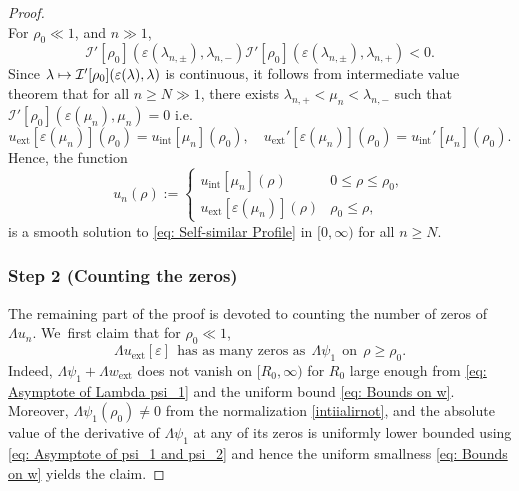\documentclass[10pt]{article}
\newcommand{\ie}{i.e.}
\newcommand\mto{\mathchoice{\longmapsto}{\mapsto}{\mapsto}{\mapsto}}
\theoremstyle{plain}
\theoremstyle{definition}
\DeclareMathOperator{\exterior}{ext}
\DeclareMathOperator{\interior}{int}
\begin{document}
\begin{proof}
\[\]
For $\rho_0\ll 1$, and $n\gg 1$,
\[
\mathcal I'[\rho_0](\varepsilon(\lambda_{n,\pm}),\lambda_{n,-})\mathcal I'[\rho_0](\varepsilon(\lambda_{n,\pm}),\lambda_{n,+})<0.
\]
Since $\lambda\mto \mathcal I'[\rho_0](\varepsilon(\lambda),\lambda)$ is continuous, it follows from intermediate value theorem that for all $n\ge N\gg1$, there exists $\lambda_{n,+}<\mu_n<\lambda_{n,-}$ such that $\mathcal I'[\rho_0](\varepsilon(\mu_n),\mu_n)=0$ \ie
\[
u_{\exterior}[\varepsilon (\mu_n)](\rho_0)=u_{\interior}[\mu_n](\rho_0),\quad u_{\exterior}'[\varepsilon (\mu_n)](\rho_0)=u_{\interior}'[\mu_n](\rho_0).
\]
Hence, the function
\[
u_n(\rho):=\begin{cases}
u_{\interior}[\mu_n](\rho) & 0\le \rho\le \rho_0,\\
u_{\exterior}[\varepsilon(\mu_n)](\rho) & \rho_0\le \rho,
\end{cases}
\]
is a smooth solution to \eqref{eq: Self-similar Profile} in $[0,\infty)$ for all $n\ge N$.

\subsubsection*{Step 2 (Counting the zeros)}
The remaining part of the proof is devoted to counting the number of zeros of $\Lambda u_n$. We~first claim that for $\rho_0\ll1$,
\begin{equation}
\label{cenjnenoeo}
\Lambda u_{\exterior}[\varepsilon]\ \ \mbox{has as many zeros as}\ \ \Lambda\psi_1 \ \ \mbox{on}\ \ \rho\geq \rho_0.
\end{equation}
Indeed, $\Lambda \psi_1+\Lambda w_{\exterior}$ does not vanish on $[R_0,\infty)$ for $R_0$ large enough from \eqref{eq: Asymptote of Lambda psi_1} and the uniform bound \eqref{eq: Bounds on w}. Moreover, $\Lambda\psi_1(\rho_0)\neq 0$ from the normalization \eqref{intiialirnot}, and the absolute value of the derivative of $\Lambda\psi_1$ at any of its zeros is uniformly lower bounded using \eqref{eq: Asymptote of psi_1 and psi_2} and hence the uniform smallness \eqref{eq: Bounds on w} yields the claim.


\end{proof}
\end{document}
